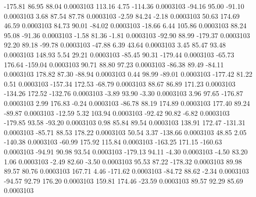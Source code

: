      -175.81       86.95       88.04     0.0003103
      113.16        4.75     -114.36     0.0003103
      -94.16       95.00      -91.10     0.0003103
        3.68       87.54       87.78     0.0003103
       -2.59       84.24       -2.18     0.0003103
       50.63      174.69       46.59     0.0003103
       84.73       90.01      -84.02     0.0003103
      -18.66        6.44      105.86     0.0003103
       88.24       95.08      -91.36     0.0003103
       -1.58       81.36       -1.81     0.0003103
      -92.90       88.99     -179.37     0.0003103
       92.20       89.18      -99.78     0.0003103
      -47.88        6.39       43.64     0.0003103
        3.45       85.47       93.48     0.0003103
      148.93        5.54       29.21     0.0003103
      -85.45       90.31     -179.44     0.0003103
      -65.73      176.64     -159.04     0.0003103
       90.71       88.80       97.23     0.0003103
      -86.38       89.49      -84.11     0.0003103
      178.82       87.30      -88.94     0.0003103
        0.44       98.99      -89.01     0.0003103
     -177.42       81.22        0.51     0.0003103
     -157.34      172.53      -68.79     0.0003103
       88.67       86.89      171.23     0.0003103
     -134.26      172.52     -132.76     0.0003103
       -3.89       93.90       -3.30     0.0003103
        3.96       97.65     -176.87     0.0003103
        2.99      176.83       -0.24     0.0003103
      -86.78       88.19      174.89     0.0003103
      177.40       89.24      -89.87     0.0003103
      -12.59        5.32      103.94     0.0003103
      -92.42       90.82       -6.82     0.0003103
     -179.85       93.58      -93.20     0.0003103
        0.98       85.84       89.54     0.0003103
      138.91      172.47     -131.31     0.0003103
      -85.71       88.53      178.22     0.0003103
       50.54        3.37     -138.66     0.0003103
       48.85        2.05     -140.38     0.0003103
      -60.99      175.92      115.84     0.0003103
     -163.25      171.15     -160.63     0.0003103
      -94.91       90.98       93.54     0.0003103
     -179.13       94.11       -4.30     0.0003103
       -4.50       83.20        1.06     0.0003103
       -2.49       82.60       -3.50     0.0003103
       95.53       87.22     -178.32     0.0003103
       89.98       89.57       80.76     0.0003103
      167.71        4.46     -171.62     0.0003103
      -84.72       88.62       -2.34     0.0003103
      -94.57       92.79      176.20     0.0003103
      159.81      174.46      -23.59     0.0003103
       89.57       92.29       85.69     0.0003103
